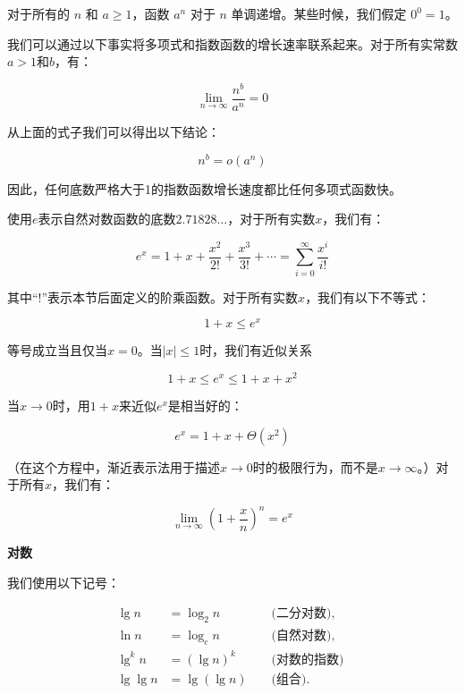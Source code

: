 \documentclass[lang=cn,newtx,10pt,scheme=chinese]{elegantbook}
\begin{document}
对于所有的 $n$ 和 $a \geq 1$，函数 $a^n$ 对于 $n$ 单调递增。某些时候，我们假定 $0^0=1$。

我们可以通过以下事实将多项式和指数函数的增长速率联系起来。对于所有实常数$a>1$和$b$，有：

$$
\lim _{n \rightarrow \infty} \frac{n^b}{a^n}=0
$$

从上面的式子我们可以得出以下结论：

\begin{equation}\label{eq:3.13}
n^b=o(a^n)
\end{equation}

因此，任何底数严格大于1的指数函数增长速度都比任何多项式函数快。

使用$e$表示自然对数函数的底数$2.71828 \ldots$，对于所有实数$x$，我们有：

$$
e^x=1+x+\frac{x^2}{2 !}+\frac{x^3}{3 !}+\cdots=\sum_{i=0}^{\infty} \frac{x^i}{i !}
$$

其中``!''表示本节后面定义的阶乘函数。对于所有实数$x$，我们有以下不等式：

\begin{equation}\label{eq:3.14}
1+x \leq e^x
\end{equation}

等号成立当且仅当$x=0$。当$|x| \leq 1$时，我们有近似关系

\begin{equation}\label{eq:3.15}
1+x \leq e^x \leq 1+x+x^2
\end{equation}

当$x \rightarrow 0$时，用$1+x$来近似$e^x$是相当好的：

$$
e^x=1+x+\Theta(x^2)
$$

（在这个方程中，渐近表示法用于描述$x \rightarrow 0$时的极限行为，而不是$x \rightarrow \infty$。）对于所有$x$，我们有：

\begin{equation}\label{eq:3.16}
\lim _{n \rightarrow \infty}(1+\frac{x}{n})^n=e^x
\end{equation}

\textbf{对数}

我们使用以下记号：

$$
\begin{aligned}
\lg n & =\log _2 n & & \text { (二分对数), } \\
\ln n & =\log _e n & & \text { (自然对数), } \\
\lg ^k n & =(\lg n)^k & & \text { (对数的指数) } \\
\lg \lg n & =\lg (\lg n) & & \text { (组合). }
\end{aligned}
$$
\end{document}

